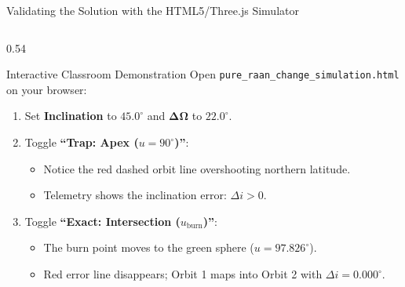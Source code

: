 \documentclass[aspectratio=169,10pt]{beamer}
\begin{document}
\begin{frame}{Validating the Solution with the HTML5/Three.js Simulator}
    \begin{columns}[t]
        \begin{column}{0.54\textwidth}
            \begin{block}{Interactive Classroom Demonstration}
                \footnotesize
                Open \texttt{pure\_raan\_change\_simulation.html} on your browser:
                \begin{enumerate}\setlength{\itemsep}{2pt}
                    \item Set \textbf{Inclination} to $45.0^\circ$ and $\bm{\Delta\Omega}$ to $22.0^\circ$.
                    \item Toggle \textbf{``Trap: Apex ($u = 90^\circ$)''}:
                    \begin{itemize}
                        \item Notice the red dashed orbit line overshooting northern latitude.
                        \item Telemetry shows the inclination error: $\Delta i > 0$.
                    \end{itemize}
                    \item Toggle \textbf{``Exact: Intersection ($u_{\text{burn}}$)''}:
                    \begin{itemize}
                        \item The burn point moves to the green sphere ($u = 97.826^\circ$).
                        \item Red error line disappears; Orbit 1 maps into Orbit 2 with $\Delta i = 0.000^\circ$.
                    \end{itemize}
                \end{enumerate}
            \end{block}
        \end{column}


\end{columns}
\end{frame}
\end{document}
